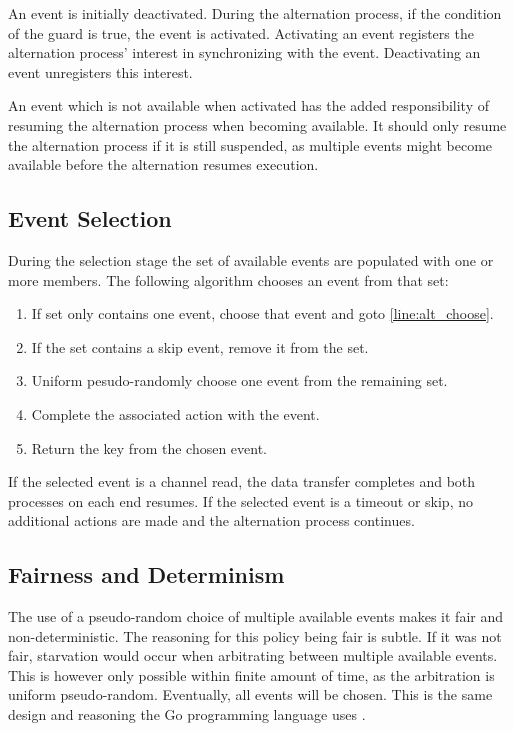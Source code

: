 An event is initially deactivated. During the alternation process, if the condition of the guard is true, the event is activated. Activating an event registers the alternation process' interest in synchronizing with the event. Deactivating an event unregisters this interest. 

An event which is not available when activated has the added responsibility of resuming the alternation process when becoming available. It should only resume the alternation process if it is still suspended, as multiple events might become available before the alternation resumes execution.

\subsection{Event Selection}
\label{subsec:alternation_fairness}

During the selection stage the set of available events are populated with one or more members. The following algorithm chooses an event from that set:

\begin{enumerate}[topsep=0em,itemsep=-1em,partopsep=0.5em,parsep=1em]
    \item If set only contains one event, choose that event and goto \ref{line:alt_choose}.
    \item If the set contains a skip event, remove it from the set.
    \item Uniform pesudo\hyp{}randomly choose one event from the remaining set. 
    \item Complete the associated action with the event. \label{line:alt_choose}
    \item Return the key from the chosen event.
\end{enumerate}

If the selected event is a channel read, the data transfer completes and both processes on each end resumes. If the selected event is a timeout or skip, no additional actions are made and the alternation process continues. 

\subsection{Fairness and Determinism}

The use of a pseudo\hyp{}random choice of multiple available events makes it fair and non\hyp{}deterministic. The reasoning for this policy being fair is subtle. If it was not fair, starvation would occur when arbitrating between multiple available events. This is however only possible within finite amount of time, as the arbitration is uniform pseudo\hyp{}random. Eventually, all events will be chosen. This is the same design and reasoning the Go programming language uses \citep[see][Select statements]{golangspec}.

